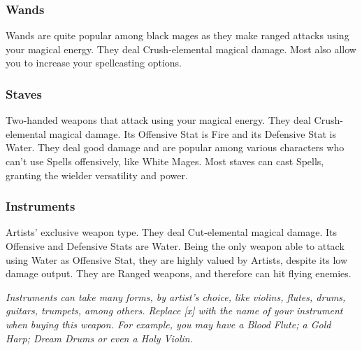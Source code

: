 \begin{tabwpn}[label=inv-rifles-crossbows,range=ranged,type=physical,element=puncture,roll=firevair]
    
\end{tabwpn}
\clearpage

\subsubsection{Wands}

Wands are quite popular among black mages as they make ranged attacks using your magical energy. They deal Crush-elemental magical damage. Most also allow you to increase your spellcasting options.

\begin{tabwpn}[label=inv-wands,range=ranged,type=magical,element=crush,roll=firevfire]
    
\end{tabwpn}
\clearpage

\subsubsection{Staves}

Two-handed weapons that attack using your magical energy. They deal Crush-elemental magical damage. Its Offensive Stat is Fire and its Defensive Stat is Water. They deal good damage and are popular among various characters who can’t use Spells offensively, like White Mages. Most staves can cast Spells, granting the wielder versatility and power.

\begin{tabwpn}[label=inv-staves,range=melee,type=magical,element=crush,roll=firevwater]
    
\end{tabwpn}
\clearpage

\subsubsection{Instruments}

Artists’ exclusive weapon type. They deal Cut-elemental magical damage. Its Offensive and Defensive Stats are Water. Being the only weapon able to attack using Water as Offensive Stat, they are highly valued by Artists, despite its low damage output. They are Ranged weapons, and therefore can hit flying enemies.

\begin{tabwpn}[label=inv-instruments,range=ranged,type=magical,element=cut,roll=watervwater]
    
\end{tabwpn}
{\footnotesize \textit{Instruments can take many forms, by artist’s choice, like violins, flutes, drums, guitars, trumpets, among others. Replace [x] with the name of your instrument when buying this weapon. For example, you may have a Blood Flute; a Gold Harp; Dream Drums or even a Holy Violin.}}
\clearpage

